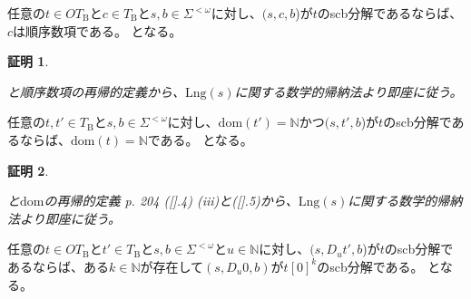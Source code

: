 \documentclass[dvipdfmx,uplatex]{jsarticle}
\theoremstyle{customnonumberbreakfortheorem}
\theoremstyle{customnonumberbreakforproof}
\newtheorem{hideableproof}{証明}
\begin{document}
\begin{lemma}[順序数項の再帰構造]\label{順序数項の再帰構造}
	任意の\(t \in OT_{\textrm{B}}\)と\(c \in T_{\textrm{B}}\)と\(s,b \in \Sigma^{< \omega}\)に対し、\((s,c,b\))が\(t\)のscb分解であるならば、\(c\)は順序数項である。
	となる。
\end{lemma}

\begin{hideableproof}
	\begin{indented}
		\item {}と順序数項の再帰的定義から、\(\textrm{Lng}(s)\)に関する数学的帰納法より即座に従う。
	\end{indented}
\end{hideableproof}

\begin{lemma}[順序数項の共終数の遺伝性]\label{順序数項の共終数の遺伝性}
	任意の\(t,t' \in T_{\textrm{B}}\)と\(s,b \in \Sigma^{< \omega}\)に対し、\(\textrm{dom}(t') = \mathbb{N}\)かつ\((s,t',b\))が\(t\)のscb分解であるならば、\(\textrm{dom}(t) = \mathbb{N}\)である。
	となる。
\end{lemma}

\begin{hideableproof}
	\begin{indented}
		\item {}と\(\textrm{dom}\)の再帰的定義\cite{buc1} p. 204 ([].4) (iii)と([].5)から、\(\textrm{Lng}(s)\)に関する数学的帰納法より即座に従う。
	\end{indented}
\end{hideableproof}

\begin{lemma}[順序数項の末尾項の零化可能性]\label{順序数項の末尾項の零化可能性}
	任意の\(t \in OT_{\textrm{B}}\)と\(t' \in T_{\textrm{B}}\)と\(s,b \in \Sigma^{< \omega}\)と\(u \in \mathbb{N}\)に対し、\((s,D_u t',b\))が\(t\)のscb分解であるならば、ある\(k \in \mathbb{N}\)が存在して\((s,D_u 0,b)\)が\(t[0]^k\)のscb分解である。
	となる。
\end{lemma}
\end{document}
